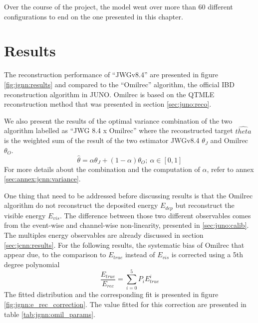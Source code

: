 \documentclass[../main.tex]{subfiles}
\begin{document}
Over the course of the project, the model went over more than 60 different configurations to end on the one presented in this chapter.

\section{Results}
\label{sec:jgnn:results}

The reconstruction performance of ``JWGv8.4'' are presented in figure \ref{fig:jgnn:results} and compared to the ``Omilrec'' algorithm, the official IBD reconstruction algorithm in JUNO. Omilrec is based on the QTMLE reconstruction method that was presented in section \ref{sec:juno:reco}.

We also present the results of the optimal variance combination of the two algorithm labelled as ``JWG 8.4 x Omilrec'' where the reconstructed target $\hat{theta}$ is the weighted sum of the result of the two estimator JWGv8.4 $\theta_J$ and Omilrec $\theta_O$.
\begin{equation}
  \hat{\theta} = \alpha \theta_J + (1 - \alpha) \theta_O; ~ \alpha \in [0, 1]
\end{equation}
For more details about the combination and the computation of $\alpha$, refer to annex \ref{sec:annex:jcnn:variance}.

One thing that need to be addressed before discussing results is that the Omilrec algorithm do not reconstruct the deposited energy $E_{dep}$ but reconstruct the visible energy $E_{vis}$. The difference between those two different observables comes from the event-wise and channel-wise non-linearity, presented in \ref{sec:juno:calib}. The multiples energy observables are already discussed in section \ref{sec:jcnn:results}. For the following results, the systematic bias of Omilrec that appear due, to the comparison to $E_{true}$ instead of $E_{vis}$ is corrected using a 5th degree polynomial
\begin{equation}
  \frac{E_{true}}{E_{rec}} = \sum_{i=0}^5 P_i E_{true}^i
\end{equation}
The fitted distribution and the corresponding fit is presented in figure \ref{fig:jgnn:e_rec_correction}. The value fitted for this correction are presented in table \ref{tab:jgnn:omil_params}.
\end{document}
